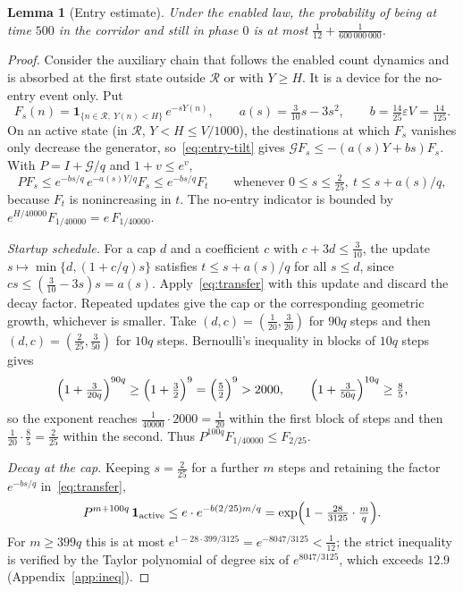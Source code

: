 \documentclass[11pt,a4paper]{article}
\theoremstyle{plain}
\newtheorem{lemma}[theorem]{Lemma}
\theoremstyle{definition}
\theoremstyle{remark}
\newcommand{\G}{\mathcal G}
\newcommand{\R}{\mathcal R}
\newcommand{\ind}{\mathbf 1}
\newcommand{\eps}{\varepsilon}
\begin{document}
\begin{lemma}[Entry estimate]\label{lem:entry}
Under the enabled law, the probability of being at time $500$ in the corridor and still in phase $0$ is at most $\frac1{12}+\frac1{600\,000\,000}$.
\end{lemma}
\begin{proof}
Consider the auxiliary chain that follows the enabled count dynamics and is absorbed at the first state outside $\R$ or with $Y\ge H$. It is a device for the no-entry event only. Put
\[
F_s(n)=\ind_{\{n\in\R,\ Y(n)<H\}}\,e^{-sY(n)},\qquad a(s)=\tfrac3{10}s-3s^2,\qquad b=\tfrac{14}{25}\eps V=\tfrac{14}{125}.
\]
On an active state (in $\R$, $Y<H\le V/1000$), the destinations at which $F_s$ vanishes only decrease the generator, so~\eqref{eq:entry-tilt} gives $\G F_s\le-(a(s)Y+bs)F_s$. With $P=I+\G/q$ and $1+v\le e^v$,
\begin{equation}\label{eq:transfer}
PF_s\le e^{-bs/q}\,e^{-a(s)Y/q}F_s\le e^{-bs/q}F_t\qquad\text{whenever }0\le s\le\tfrac2{25},\ t\le s+a(s)/q,
\end{equation}
because $F_t$ is nonincreasing in $t$. The no-entry indicator is bounded by $e^{H/40000}F_{1/40000}=e\,F_{1/40000}$.

\emph{Startup schedule.} For a cap $d$ and a coefficient $c$ with $c+3d\le\frac3{10}$, the update $s\mapsto\min\{d,(1+c/q)s\}$ satisfies $t\le s+a(s)/q$ for all $s\le d$, since $cs\le(\frac3{10}-3s)s=a(s)$. Apply~\eqref{eq:transfer} with this update and discard the decay factor. Repeated updates give the cap or the corresponding geometric growth, whichever is smaller. Take $(d,c)=(\frac1{20},\frac3{20})$ for $90q$ steps and then $(d,c)=(\frac2{25},\frac3{50})$ for $10q$ steps. Bernoulli's inequality in blocks of $10q$ steps gives
\[
\Bigl(1+\tfrac{3}{20q}\Bigr)^{90q}\ge\Bigl(1+\tfrac{3}{2}\Bigr)^{9}=\Bigl(\tfrac52\Bigr)^9>2000,\qquad
\Bigl(1+\tfrac{3}{50q}\Bigr)^{10q}\ge\tfrac85 ,
\]
so the exponent reaches $\frac1{40000}\cdot2000=\frac1{20}$ within the first block of steps and then $\frac1{20}\cdot\frac85=\frac2{25}$ within the second. Thus $P^{100q}F_{1/40000}\le F_{2/25}$.

\emph{Decay at the cap.} Keeping $s=\frac2{25}$ for a further $m$ steps and retaining the factor $e^{-bs/q}$ in~\eqref{eq:transfer},
\begin{equation}\label{eq:discrete}
P^{m+100q}\,\ind_{\mathrm{active}}\le e\cdot e^{-b(2/25)m/q}=\exp\Bigl(1-\tfrac{28}{3125}\cdot\tfrac mq\Bigr).
\end{equation}
For $m\ge399q$ this is at most $e^{1-28\cdot399/3125}=e^{-8047/3125}<\frac1{12}$; the strict inequality is verified by the Taylor polynomial of degree six of $e^{8047/3125}$, which exceeds $12.9$ (Appendix~\ref{app:ineq}).


\end{proof}
\end{document}
